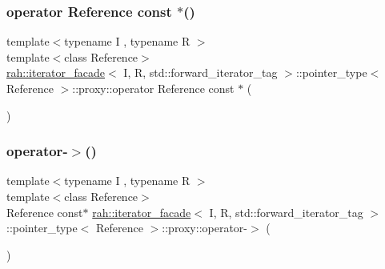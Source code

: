 \subsubsection{\texorpdfstring{operator Reference const $\ast$()}{operator Reference const *()}\hspace{0.1cm}{\footnotesize\ttfamily [2/2]}}
{\footnotesize\ttfamily template$<$typename I , typename R $>$ \\
template$<$class Reference$>$ \\
\mbox{\hyperlink{structrah_1_1iterator__facade}{rah\+::iterator\+\_\+facade}}$<$ I, R, std\+::forward\+\_\+iterator\+\_\+tag $>$\+::pointer\+\_\+type$<$ Reference $>$\+::proxy\+::operator Reference const $\ast$ (\begin{DoxyParamCaption}{ }\end{DoxyParamCaption})\hspace{0.3cm}{\ttfamily [inline]}}

\mbox{\label{structrah_1_1iterator__facade_3_01_i_00_01_r_00_01std_1_1forward__iterator__tag_01_4_1_1pointer__type_1_1proxy_abc11e6f8fe21b3045765f1f3cc0d61ae}} 
\subsubsection{\texorpdfstring{operator-\/$>$()}{operator->()}\hspace{0.1cm}{\footnotesize\ttfamily [1/2]}}
{\footnotesize\ttfamily template$<$typename I , typename R $>$ \\
template$<$class Reference$>$ \\
Reference const$\ast$ \mbox{\hyperlink{structrah_1_1iterator__facade}{rah\+::iterator\+\_\+facade}}$<$ I, R, std\+::forward\+\_\+iterator\+\_\+tag $>$\+::pointer\+\_\+type$<$ Reference $>$\+::proxy\+::operator-\/$>$ (\begin{DoxyParamCaption}{ }\end{DoxyParamCaption})\hspace{0.3cm}{\ttfamily [inline]}}

